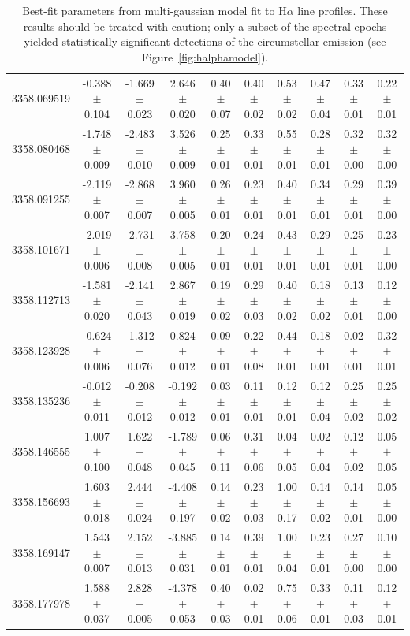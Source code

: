 \documentclass[11pt,twocolumn,tighten,linenumbers]{aastex7}
\begin{document}
\begin{table}
\begin{tabular}{lccccccccc}
  3358.069519 & -0.388 $\pm$ 0.104 & -1.669 $\pm$ 0.023 & 2.646 $\pm$ 0.020 & 0.40 $\pm$ 0.07 & 0.40 $\pm$ 0.02 & 0.53 $\pm$ 0.02 & 0.47 $\pm$ 0.04 & 0.33 $\pm$ 0.01 & 0.22 $\pm$ 0.01 \\
  3358.080468 & -1.748 $\pm$ 0.009 & -2.483 $\pm$ 0.010 & 3.526 $\pm$ 0.009 & 0.25 $\pm$ 0.01 & 0.33 $\pm$ 0.01 & 0.55 $\pm$ 0.01 & 0.28 $\pm$ 0.01 & 0.32 $\pm$ 0.00 & 0.32 $\pm$ 0.00 \\
  3358.091255 & -2.119 $\pm$ 0.007 & -2.868 $\pm$ 0.007 & 3.960 $\pm$ 0.005 & 0.26 $\pm$ 0.01 & 0.23 $\pm$ 0.01 & 0.40 $\pm$ 0.01 & 0.34 $\pm$ 0.01 & 0.29 $\pm$ 0.01 & 0.39 $\pm$ 0.00 \\
  3358.101671 & -2.019 $\pm$ 0.006 & -2.731 $\pm$ 0.008 & 3.758 $\pm$ 0.005 & 0.20 $\pm$ 0.01 & 0.24 $\pm$ 0.01 & 0.43 $\pm$ 0.01 & 0.29 $\pm$ 0.01 & 0.25 $\pm$ 0.01 & 0.23 $\pm$ 0.00 \\
  3358.112713 & -1.581 $\pm$ 0.020 & -2.141 $\pm$ 0.043 & 2.867 $\pm$ 0.019 & 0.19 $\pm$ 0.02 & 0.29 $\pm$ 0.03 & 0.40 $\pm$ 0.02 & 0.18 $\pm$ 0.02 & 0.13 $\pm$ 0.01 & 0.12 $\pm$ 0.00 \\
  3358.123928 & -0.624 $\pm$ 0.006 & -1.312 $\pm$ 0.076 & 0.824 $\pm$ 0.012 & 0.09 $\pm$ 0.01 & 0.22 $\pm$ 0.08 & 0.44 $\pm$ 0.01 & 0.18 $\pm$ 0.01 & 0.02 $\pm$ 0.01 & 0.32 $\pm$ 0.01 \\
  3358.135236 & -0.012 $\pm$ 0.011 & -0.208 $\pm$ 0.012 & -0.192 $\pm$ 0.012 & 0.03 $\pm$ 0.01 & 0.11 $\pm$ 0.01 & 0.12 $\pm$ 0.01 & 0.12 $\pm$ 0.04 & 0.25 $\pm$ 0.02 & 0.25 $\pm$ 0.02 \\
  3358.146555 & 1.007 $\pm$ 0.100 & 1.622 $\pm$ 0.048 & -1.789 $\pm$ 0.045 & 0.06 $\pm$ 0.11 & 0.31 $\pm$ 0.06 & 0.04 $\pm$ 0.05 & 0.02 $\pm$ 0.04 & 0.12 $\pm$ 0.02 & 0.05 $\pm$ 0.05 \\
  3358.156693 & 1.603 $\pm$ 0.018 & 2.444 $\pm$ 0.024 & -4.408 $\pm$ 0.197 & 0.14 $\pm$ 0.02 & 0.23 $\pm$ 0.03 & 1.00 $\pm$ 0.17 & 0.14 $\pm$ 0.02 & 0.14 $\pm$ 0.01 & 0.05 $\pm$ 0.00 \\
  3358.169147 & 1.543 $\pm$ 0.007 & 2.152 $\pm$ 0.013 & -3.885 $\pm$ 0.031 & 0.14 $\pm$ 0.01 & 0.39 $\pm$ 0.01 & 1.00 $\pm$ 0.04 & 0.23 $\pm$ 0.01 & 0.27 $\pm$ 0.00 & 0.10 $\pm$ 0.00 \\
  3358.177978 & 1.588 $\pm$ 0.037 & 2.828 $\pm$ 0.005 & -4.378 $\pm$ 0.053 & 0.40 $\pm$ 0.03 & 0.02 $\pm$ 0.01 & 0.75 $\pm$ 0.06 & 0.33 $\pm$ 0.01 & 0.11 $\pm$ 0.03 & 0.12 $\pm$ 0.01 \\
  \hline
  \end{tabular}
  \caption{Best-fit parameters from multi-gaussian model fit to H$\alpha$ line
  profiles.  These results should be treated with caution; only a
  subset of the spectral epochs yielded statistically significant
  detections of the circumstellar emission (see
  Figure~\ref{fig:halphamodel}).}
  \label{tab:halphamodelparams}
\end{table}
\end{document}
